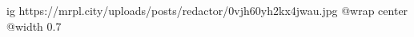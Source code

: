  
 
 
 
 

\ifcmt
  ig https://mrpl.city/uploads/posts/redactor/0vjh60yh2kx4jwau.jpg
  @wrap center
  @width 0.7
\fi
